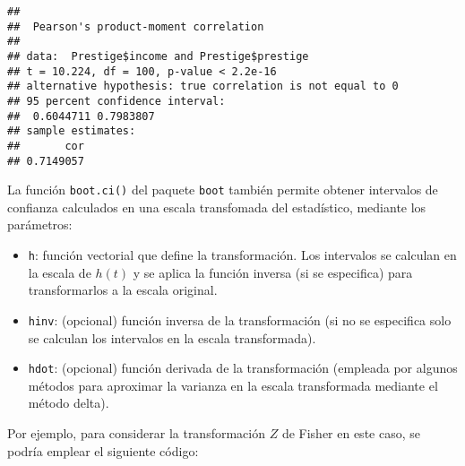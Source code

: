 \documentclass[
]{book}
\newenvironment{Shaded}{\begin{snugshade}}{\end{snugshade}}
\newcommand{\CommentTok}[1]{\textcolor[rgb]{0.56,0.35,0.01}{\textit{#1}}}
\newcommand{\ControlFlowTok}[1]{\textcolor[rgb]{0.13,0.29,0.53}{\textbf{#1}}}
\newcommand{\DataTypeTok}[1]{\textcolor[rgb]{0.13,0.29,0.53}{#1}}
\newcommand{\DecValTok}[1]{\textcolor[rgb]{0.00,0.00,0.81}{#1}}
\newcommand{\KeywordTok}[1]{\textcolor[rgb]{0.13,0.29,0.53}{\textbf{#1}}}
\newcommand{\NormalTok}[1]{#1}
\newcommand{\OperatorTok}[1]{\textcolor[rgb]{0.81,0.36,0.00}{\textbf{#1}}}
\newcommand{\StringTok}[1]{\textcolor[rgb]{0.31,0.60,0.02}{#1}}
\theoremstyle{break}
\theoremstyle{definition}
\theoremstyle{definition}
\theoremstyle{definition}
\theoremstyle{remark}
\begin{document}
\begin{verbatim}
## 
##  Pearson's product-moment correlation
## 
## data:  Prestige$income and Prestige$prestige
## t = 10.224, df = 100, p-value < 2.2e-16
## alternative hypothesis: true correlation is not equal to 0
## 95 percent confidence interval:
##  0.6044711 0.7983807
## sample estimates:
##       cor 
## 0.7149057
\end{verbatim}

La función \texttt{boot.ci()} del paquete \texttt{boot} también permite obtener intervalos de confianza calculados en una escala transfomada del estadístico,
mediante los parámetros:

\begin{itemize}
\item
  \texttt{h}: función vectorial que define la transformación.
  Los intervalos se calculan en la escala de \(h(t)\) y se aplica la función inversa (si se especifica) para transformarlos a la escala original.
\item
  \texttt{hinv}: (opcional) función inversa de la transformación
  (si no se especifica solo se calculan los intervalos en la escala transformada).
\item
  \texttt{hdot}: (opcional) función derivada de la transformación
  (empleada por algunos métodos para aproximar la varianza en la escala transformada mediante el método delta).
\end{itemize}

Por ejemplo, para considerar la transformación \(Z\) de Fisher en este caso, se podría emplear el siguiente código:

\begin{Shaded}
\end{Shaded}
\end{document}

